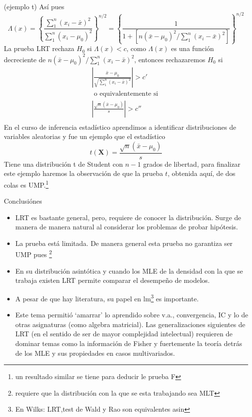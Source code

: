 \documentclass{beamer}
\begin{document}
\begin{frame}{(ejemplo t)}
\tiny{Así pues} 
\[
\Lambda(x) =\left\{ \frac{\sum_1^n(x_i-\bar{x})^2}{\sum_1^n(x_i-\mu_0)^2} \right\}^{n/2} = \left\{ \frac{1}{   1+[n(\bar{x}-\mu_0)^2/\sum_1^n(x_i-\bar{x})^2  ]} \right\}^{n/2}
\]
La prueba LRT rechaza $H_0$ si $\Lambda (x) <c $, como  $\Lambda (x)$ es una función decreciente de $n(\bar{x}-\mu_0)^2/\sum_1^n(x_i-\bar{x})^2$, entonces rechazaremos $H_0$ si  
\[
\begin{split}
	\left| \frac{\bar{x}-\mu_0}{\sqrt{\sum_1^n(x_i-\bar{x})^2}}\right| > c'\\
    \textrm{ o equivalentemente si } \\
    	\left| \frac{\sqrt{n}(\bar{x}-\mu_0)}{s}\right| > c''\\
\end{split}
\]
En el curso de inferencia estadístico aprendimos a identificar distribuciones de variables aleatorias y fue un ejemplo que el estadístico 
\[
t(\mathbf{X}) = \frac{\sqrt{n}(\bar{x}-\mu_0)}{s}
\]
\tiny{Tiene una distribución t de Student con $n-1$ grados de libertad, para finalizar este ejemplo haremos la observación de que la prueba $t$, obtenida aquí, de dos colas es UMP.}\footnote{un resultado similar se tiene para deducir le prueba F}
\end{frame}





\begin{frame}{Conclusiónes}
\begin{itemize}
\item LRT es bastante general, pero, requiere de conocer la distribución. Surge de manera de manera natural al considerar los problemas de probar hipótesis. 

\item La prueba está limitada. De manera general esta prueba no garantiza ser UMP pues \footnote{requiere que la distribución con la que se esta trabajando sea MLT} 
\item En su distribución asintótica y cuando los MLE de la densidad con la que se trabaja existen LRT permite comparar el desempeño de modelos. \item A pesar de que hay literatura, su papel en lm\footnote{ En Wilks:  LRT,test de Wald y  Rao son equivalentes asin} es importante. 

\item Este tema permitió ‘amarrar’ lo aprendido sobre v.a., convergencia, IC y lo de otras asignaturas (como algebra matricial). Las generalizaciones siguientes de LRT (en el sentido de ser de mayor complejidad intelectual) requieren de dominar temas como la información de Fisher y fuertemente la teoría detrás de los MLE y sus propiedades en casos multivariados.
\end{itemize}
\end{frame}
\end{document}
